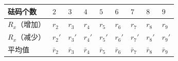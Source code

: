 \documentclass[12pt,a4paper,UTF8]{ctexart}
\newcounter{none}
\begin{document}
{\def\LTcaptype{none} %
\begin{longtable}[]{@{}
  >{\centering\arraybackslash}p{}
  >{\centering\arraybackslash}p{}
  >{\centering\arraybackslash}p{}
  >{\centering\arraybackslash}p{}
  >{\centering\arraybackslash}p{}
  >{\centering\arraybackslash}p{}
  >{\centering\arraybackslash}p{}
  >{\centering\arraybackslash}p{}
  >{\centering\arraybackslash}p{}@{}}
\toprule\noalign{}
\begin{minipage}[b]{\linewidth}\centering
砝码个数
\end{minipage} & \begin{minipage}[b]{\linewidth}\centering
\(2\)
\end{minipage} & \begin{minipage}[b]{\linewidth}\centering
\(3\)
\end{minipage} & \begin{minipage}[b]{\linewidth}\centering
\(4\)
\end{minipage} & \begin{minipage}[b]{\linewidth}\centering
\(5\)
\end{minipage} & \begin{minipage}[b]{\linewidth}\centering
\(6\)
\end{minipage} & \begin{minipage}[b]{\linewidth}\centering
\(7\)
\end{minipage} & \begin{minipage}[b]{\linewidth}\centering
\(8\)
\end{minipage} & \begin{minipage}[b]{\linewidth}\centering
\(9\)
\end{minipage} \\
\midrule\noalign{}
\endhead
\bottomrule\noalign{}
\endlastfoot
\(R_x\)（增加） & \(r_2\) & \(r_3\) & \(r_4\) & \(r_5\) & \(r_6\) &
\(r_7\) & \(r_8\) & \(r_9\) \\
\(R_x\)（减少） & \(r_2'\) & \(r_3'\) & \(r_4'\) & \(r_5'\) & \(r_6'\) &
\(r_7'\) & \(r_8'\) & \(r_9'\) \\
平均值 & \(\bar r_2\) & \(\bar r_3\) & \(\bar r_4\) & \(\bar r_5\) &
\(\bar r_6\) & \(\bar r_7\) & \(\bar r_8\) & \(\bar r_9\) \\
\end{longtable}
}
\end{document}
